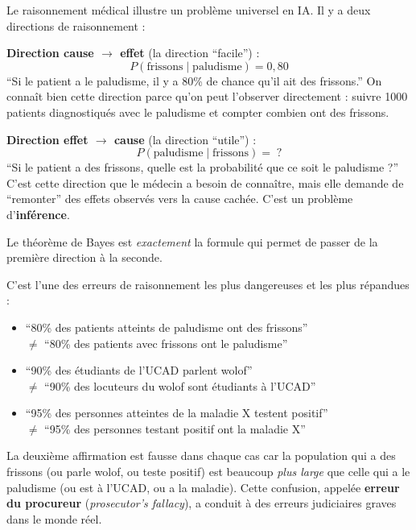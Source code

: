 \documentclass[11pt,a4paper]{article}
\begin{document}
Le raisonnement médical illustre un problème universel en IA. Il y a deux directions de raisonnement :

\textbf{Direction cause $\to$ effet} (la direction ``facile'') :
$$P(\text{frissons} \mid \text{paludisme}) = 0{,}80$$
``Si le patient a le paludisme, il y a 80\% de chance qu'il ait des frissons.'' On connaît bien cette direction parce qu'on peut l'observer directement : suivre 1000 patients diagnostiqués avec le paludisme et compter combien ont des frissons.

\textbf{Direction effet $\to$ cause} (la direction ``utile'') :
$$P(\text{paludisme} \mid \text{frissons}) = \;?$$
``Si le patient a des frissons, quelle est la probabilité que ce soit le paludisme ?'' C'est cette direction que le médecin a besoin de connaître, mais elle demande de ``remonter'' des effets observés vers la cause cachée. C'est un problème d'\textbf{inférence}.

Le théorème de Bayes est \textit{exactement} la formule qui permet de passer de la première direction à la seconde.

\begin{attentionbox}
C'est l'une des erreurs de raisonnement les plus dangereuses et les plus répandues :

\begin{itemize}
    \item ``80\% des patients atteints de paludisme ont des frissons'' \\
    $\neq$ ``80\% des patients avec frissons ont le paludisme''
    
    \item ``90\% des étudiants de l'UCAD parlent wolof'' \\
    $\neq$ ``90\% des locuteurs du wolof sont étudiants à l'UCAD''
    
    \item ``95\% des personnes atteintes de la maladie X testent positif'' \\
    $\neq$ ``95\% des personnes testant positif ont la maladie X''
\end{itemize}

La deuxième affirmation est fausse dans chaque cas car la population qui a des frissons (ou parle wolof, ou teste positif) est beaucoup \textit{plus large} que celle qui a le paludisme (ou est à l'UCAD, ou a la maladie). Cette confusion, appelée \textbf{erreur du procureur} (\textit{prosecutor's fallacy}), a conduit à des erreurs judiciaires graves dans le monde réel.
\end{attentionbox}
\end{document}
